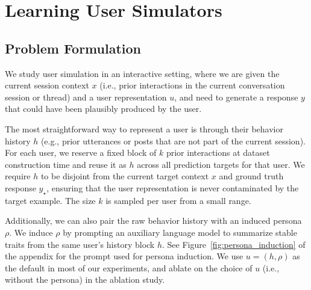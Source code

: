 \documentclass{article} %
\begin{document}


\section{Learning User Simulators}

\subsection{Problem Formulation}\label{sec:problem}


We study user simulation in an interactive setting, where we are given the current session context $x$ (i.e., prior interactions in the current conversation session or thread) and a user representation $u$, and need to generate a response $y$ that could have been plausibly produced by the user. 

The most straightforward way to represent a user is through their behavior history $h$ (e.g., prior utterances or posts that are not part of the current session). For each user, we reserve a fixed block of $k$ prior interactions at dataset construction time and reuse it as $h$ across all prediction targets for that user. We require $h$ to be disjoint from the current target context $x$ and ground truth response $y_\star$, ensuring that the user representation is never contaminated by the target example. The size $k$ is sampled per user from a small range.

Additionally, we can also pair the raw behavior history with an induced persona $\rho$. We induce $\rho$ by prompting an auxiliary language model to summarize stable traits from the same user's history block $h$. See  Figure~\ref{fig:persona_induction} of the appendix for the prompt used for persona induction. We use $u = (h, \rho)$ as the default in most of our experiments, and ablate on the choice of $u$ (i.e., without the persona) in the ablation study.
\end{document}

